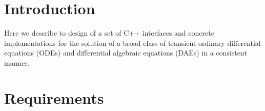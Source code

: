 \documentclass[pdf,ps2pdf,11pt]{SANDreport}
\begin{document}

%
\setcounter{secnumdepth}{3}
\SANDmain %

\section{Introduction}

Here we describe to design of a set of C++ interfaces and concrete
implementations for the solution of a broad class of transient ordinary
differential equations (ODEs) and differential algebraic equations (DAEs) in a
consistent manner.

\section{Requirements}
\end{document}
